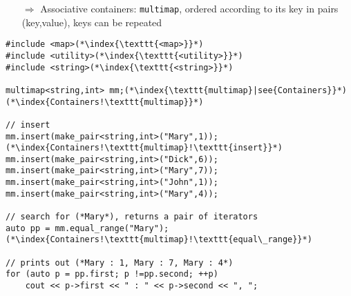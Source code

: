 \documentclass[10pt]{article}
\begin{document}
\begin{enumerate}
\item[$\Rightarrow$] Associative containers: \texttt{multimap}, ordered according to its key in pairs (key,value), keys can be repeated
\end{enumerate}
\begin{lstlisting}
#include <map>(*\index{\texttt{<map>}}*)
#include <utility>(*\index{\texttt{<utility>}}*)
#include <string>(*\index{\texttt{<string>}}*)

multimap<string,int> mm;(*\index{\texttt{multimap}|see{Containers}}*)(*\index{Containers!\texttt{multimap}}*)
 
// insert
mm.insert(make_pair<string,int>("Mary",1));(*\index{Containers!\texttt{multimap}!\texttt{insert}}*)
mm.insert(make_pair<string,int>("Dick",6));
mm.insert(make_pair<string,int>("Mary",7));
mm.insert(make_pair<string,int>("John",1));
mm.insert(make_pair<string,int>("Mary",4));

// search for (*Mary*), returns a pair of iterators
auto pp = mm.equal_range("Mary");(*\index{Containers!\texttt{multimap}!\texttt{equal\_range}}*)

// prints out (*Mary : 1, Mary : 7, Mary : 4*)
for (auto p = pp.first; p !=pp.second; ++p)
    cout << p->first << " : " << p->second << ", ";
\end{lstlisting}
%
%
\end{document}
